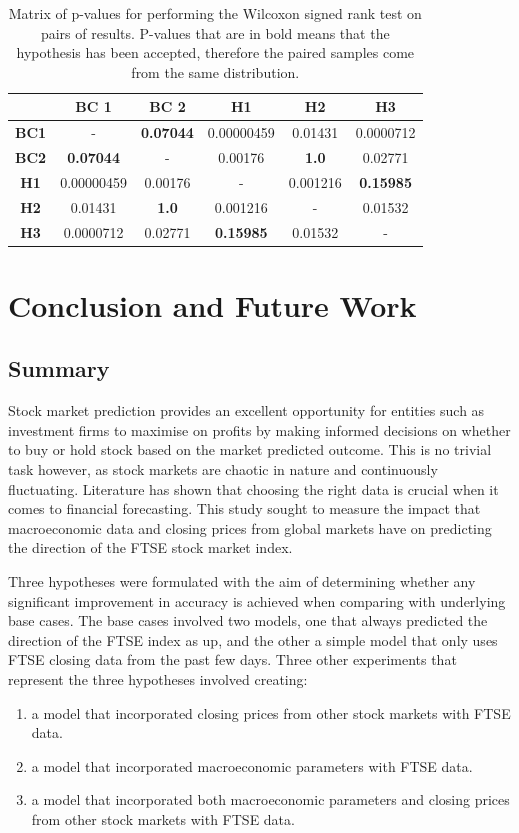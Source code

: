 \documentclass{UoYCSproject}
\begin{document}
\begin{table}[h]
    \centering
    \begin{tabular}{|c|c|c|c|c|c|} \hline
         &  \textbf{BC 1} & \textbf{BC 2} & \textbf{H1} & \textbf{H2} & \textbf{H3} \\ \hline
        \textbf{BC1} & - & \textbf{0.07044} & 0.00000459 &  0.01431 & 0.0000712\\
        \textbf{BC2} & \textbf{0.07044} & - & 0.00176 & \textbf{1.0} & 0.02771 \\
        \textbf{H1} & 0.00000459 & 0.00176 & - & 0.001216 & \textbf{0.15985} \\
        \textbf{H2} & 0.01431 & \textbf{1.0} & 0.001216 & - & 0.01532\\
        \textbf{H3} & 0.0000712 & 0.02771 & \textbf{0.15985} & 0.01532 & -  \\
        \hline
    \end{tabular}
    \caption{Matrix of p-values for performing the Wilcoxon signed rank test on pairs of results. P-values that are in bold means that the hypothesis has been accepted, therefore the paired samples come from the same distribution. }
    \label{tab:wilcoxon_results}
\end{table}


\chapter{Conclusion and Future Work}
\label{cha:conclusions}

\section{Summary}
Stock market prediction provides an excellent opportunity for entities such as investment firms to maximise on profits by making informed decisions on whether to buy or hold stock based on the market predicted outcome. This is no trivial task however, as stock markets are chaotic in nature and continuously fluctuating. Literature has shown that choosing the right data is crucial when it comes to financial forecasting. This study sought to measure the impact that macroeconomic data and closing prices from global markets have on predicting the direction of the FTSE stock market index. 

Three hypotheses were formulated with the aim of determining whether any significant improvement in accuracy is achieved when comparing with underlying base cases. The base cases involved two models, one that always predicted the direction of the FTSE index as up, and the other a simple model that only uses FTSE closing data from the past few days. Three other experiments that represent the three hypotheses involved creating:
\begin{enumerate}
    \item a model that incorporated closing prices from other stock markets with FTSE data.
    \item a model that incorporated macroeconomic parameters with FTSE data.
    \item a model that incorporated both macroeconomic parameters and closing prices from other stock markets with FTSE data. 
\end{enumerate}
\end{document}
